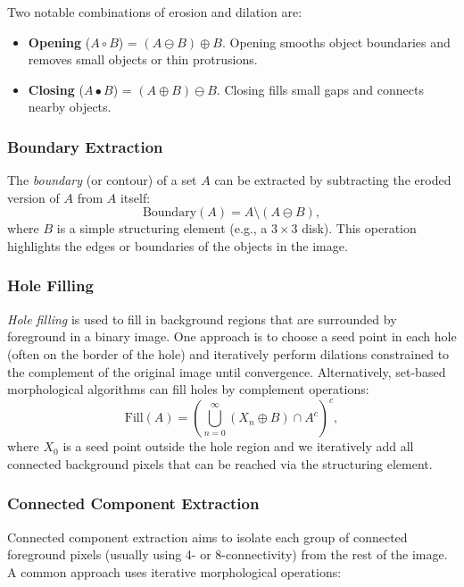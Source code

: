 \documentclass[a4paper,12pt]{article}
\begin{document}
Two notable combinations of erosion and dilation are:
\begin{itemize}
    \item \textbf{Opening} (\(A \circ B\)) = \((A \ominus B) \oplus B\). Opening smooths object boundaries and removes small objects or thin protrusions.
    \item \textbf{Closing} (\(A \bullet B\)) = \((A \oplus B) \ominus B\). Closing fills small gaps and connects nearby objects.
\end{itemize}

\subsubsection{Boundary Extraction}

The \emph{boundary} (or contour) of a set \(A\) can be extracted by subtracting the eroded version of \(A\) from \(A\) itself:
\[
  \text{Boundary}(A) = A \setminus (A \ominus B),
\]
where \(B\) is a simple structuring element (e.g., a \(3 \times 3\) disk). This operation highlights the edges or boundaries of the objects in the image.

\subsubsection{Hole Filling}

\emph{Hole filling} is used to fill in background regions that are surrounded by foreground in a binary image. One approach is to choose a seed point in each hole (often on the border of the hole) and iteratively perform dilations constrained to the complement of the original image until convergence. Alternatively, set-based morphological algorithms can fill holes by complement operations:
\[
  \text{Fill}(A) = \left( \bigcup_{n=0}^{\infty} (X_n \oplus B) \cap A^c \right)^c,
\]
where \(X_0\) is a seed point outside the hole region and we iteratively add all connected background pixels that can be reached via the structuring element.

\subsubsection{Connected Component Extraction}

Connected component extraction aims to isolate each group of connected foreground pixels (usually using 4- or 8-connectivity) from the rest of the image. A common approach uses iterative morphological operations:
\end{document}
